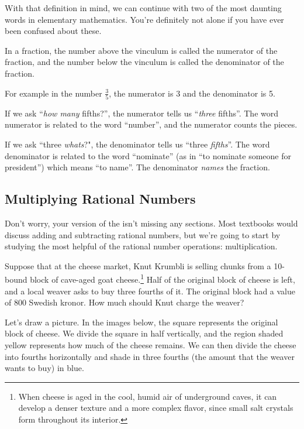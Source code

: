 With that definition in mind, we can continue with two of the most daunting words in elementary mathematics. You're definitely not alone if you have ever been confused about these.

\begin{boxeddef}
In a fraction, the number above the vinculum is called the \gls{numerator} of the fraction, and the number below the vinculum is called the \gls{denominator} of the fraction.

For example in the number $\frac{3}{5}$, the numerator is 3 and the denominator is 5.
\end{boxeddef}

If we ask ``{\em how many} fifths?'', the numerator tells us ``{\em three} fifths''. The word numerator is related to the word ``number'', and the numerator counts the pieces.

If we ask ``three {\em whats}?", the denominator tells us ``three {\em fifths}''. The word denominator is related to the word ``nominate'' (as in ``to nominate someone for president'') which means ``to name''. The denominator {\em names} the fraction.

\subsection{Multiplying Rational Numbers}

Don't worry, your version of the \algebranomicon{} isn't missing any sections. Most textbooks would discuss adding and subtracting rational numbers, but we're going to start by studying the most helpful of the rational number operations: multiplication.

Suppose that at the cheese market, Knut Krumbli is selling chunks from a 10-bound block of cave-aged goat cheese.\footnote{When cheese is aged in the cool, humid air of underground caves, it can develop a denser texture and a more complex flavor, since small salt crystals form throughout its interior.} Half of the original block of cheese is left, and a local weaver asks to buy three fourths of it. The original block had a value of 800 Swedish kronor. How much should Knut charge the weaver?

Let's draw a picture. In the images below, the square represents the original block of cheese. We divide the square in half vertically, and the region shaded yellow represents how much of the cheese remains. We can then divide the cheese into fourths horizontally and shade in three fourths (the amount that the weaver wants to buy) in blue.

